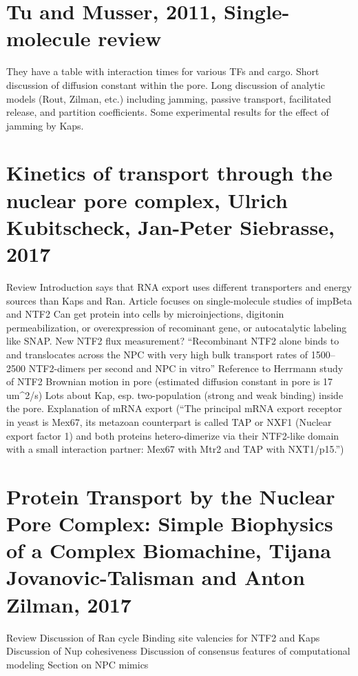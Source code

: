 \section{Tu and Musser, 2011, Single-molecule review}

They have a table with interaction times for various TFs and cargo.
Short discussion of diffusion constant within the pore.
Long discussion of analytic models (Rout, Zilman, etc.) including jamming, passive transport, facilitated release, and partition coefficients.
Some experimental results for the effect of jamming by Kaps.

\section{Kinetics of transport through the nuclear pore complex, Ulrich Kubitscheck, Jan-Peter Siebrasse, 2017}

Review
Introduction says that RNA export uses different transporters and energy sources than Kaps and Ran.
Article focuses on single-molecule studies of impBeta and NTF2
Can get protein into cells by microinjections, digitonin permeabilization, or overexpression of recominant gene, or autocatalytic labeling like SNAP.
New NTF2 flux measurement? ``Recombinant NTF2 alone binds to and translocates across the NPC with very high bulk transport rates of 1500–2500 NTF2-dimers per second and NPC in vitro''
Reference to Herrmann study of NTF2 Brownian motion in pore (estimated diffusion constant in pore is 17 um^2/s)
Lots about Kap, esp. two-population (strong and weak binding) inside the pore.
Explanation of mRNA export (``The principal mRNA export receptor in yeast is Mex67, its metazoan counterpart is called TAP or NXF1 (Nuclear export factor 1) and both proteins hetero-dimerize via their NTF2-like domain with a small interaction partner: Mex67 with Mtr2 and TAP with NXT1/p15.'')

\section{Protein Transport by the Nuclear Pore Complex: Simple Biophysics of a Complex Biomachine, Tijana Jovanovic-Talisman and Anton Zilman, 2017}

Review
Discussion of Ran cycle
Binding site valencies for NTF2 and Kaps
Discussion of Nup cohesiveness
Discussion of consensus features of computational modeling
Section on NPC mimics